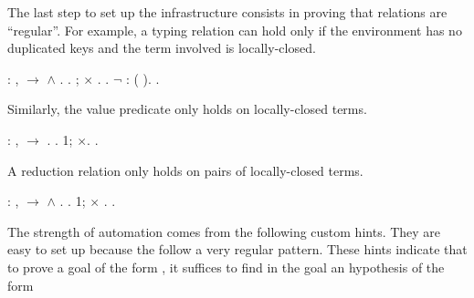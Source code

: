 \documentclass[12pt]{report}
\begin{document}
 The last step to set up the infrastructure consists in proving
    that relations are ``regular''. For example, a typing relation can 
    hold only if the environment has no duplicated keys and the term 
    involved is locally-closed. \begin{coqdoccode}
\coqdocemptyline
\coqdocnoindent
{}  : \coqdockw{\ensuremath{\forall}}   ,\coqdoceol
\coqdocindent{1.00em}
    \ensuremath{\rightarrow}   \ensuremath{\land}  .\coqdoceol
\coqdocnoindent
{}.\coqdoceol
\coqdocindent{1.00em}
; \ensuremath{\times} .\coqdoceol
\coqdocindent{1.00em}
 . \ensuremath{\lnot} : ( ).\coqdoceol
\coqdocnoindent
{}.\coqdoceol
\coqdocemptyline
\end{coqdoccode}
Similarly, the value predicate only holds on locally-closed terms. \begin{coqdoccode}
\coqdocemptyline
\coqdocnoindent
{}  : \coqdockw{\ensuremath{\forall}} ,\coqdoceol
\coqdocindent{1.00em}
  \ensuremath{\rightarrow}  .\coqdoceol
\coqdocnoindent
{}.  1; \ensuremath{\times}. .\coqdoceol
\coqdocemptyline
\end{coqdoccode}
A reduction relation only holds on pairs of locally-closed terms. \begin{coqdoccode}
\coqdocemptyline
\coqdocnoindent
{}  : \coqdockw{\ensuremath{\forall}}  ,\coqdoceol
\coqdocindent{1.00em}
   \ensuremath{\rightarrow}   \ensuremath{\land}  .\coqdoceol
\coqdocnoindent
{}.  1; \ensuremath{\times} . .\coqdoceol
\coqdocemptyline
\end{coqdoccode}
The strength of automation comes from the following custom hints.
    They are easy to set up because the follow a very regular pattern.
    These hints indicate that to prove a goal of the form  ,
    it suffices to find in the goal an hypothesis of the form
\end{document}
